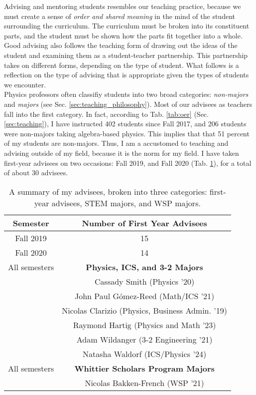\documentclass[../../../main.tex]{subfiles}
\begin{document}
Advising and mentoring students resembles our teaching practice, because we must create a sense of \textit{order and shared meaning} in the mind of the student surrounding the curriculum.  The curriculum must be broken into its constituent parts, and the student must be shown how the parts fit together into a whole.  Good advising also follows the teaching form of drawing out the ideas of the student and examining them as a student-teacher partnership.  This partnership takes on different forms, depending on the type of student.  What follows is a reflection on the type of advising that is appropriate given the types of students we encounter.
\\
\vspace{0.25cm}
Physics professors often classifiy students into two broad categories: \textit{non-majors} and \textit{majors} (see Sec. \ref{sec:teaching_philosophy}).  Most of our advisees as teachers fall into the first category.  In fact, according to Tab. \ref{tab:oer} (Sec. \ref{sec:teaching}), I have instructed 402 students since Fall 2017, and 206 students were non-majors taking algebra-based physics.  This implies that that 51 percent of my students are non-majors.  Thus, I am a accustomed to teaching and advising outside of my field, because it is the norm for my field.  I have taken first-year advisees on two occasions: Fall 2019, and Fall 2020 (Tab. \ref{tab:advisees}), for a total of about 30 advisees.
\\
\vspace{0.25cm}

\begin{table}
\centering
\begin{tabular}{| c | c |}
\hline
\hline
Semester & \textbf{Number of First Year Advisees} \\ \hline
Fall 2019 & 15 \\ \hline
Fall 2020 & 14 \\ \hline
\hline
All semesters & \textbf{Physics, ICS, and 3-2 Majors} \\ \hline 
& Cassady Smith (Physics '20) \\ \hline
& John Paul G\'{o}mez-Reed (Math/ICS '21) \\ \hline
& Nicolas Clarizio (Physics, Business Admin. '19) \\ \hline
& Raymond Hartig (Physics and Math '23) \\ \hline
& Adam Wildanger (3-2 Engineering '21) \\ \hline
& Natasha Waldorf (ICS/Physics '24) \\ \hline \hline
All semesters & \textbf{Whittier Scholars Program Majors} \\ \hline
& Nicolas Bakken-French (WSP '21) \\ \hline
\end{tabular}
\caption{\label{tab:advisees} A summary of my advisees, broken into three categories: first-year advisees, STEM majors, and WSP majors.}
\end{table}
\end{document}
